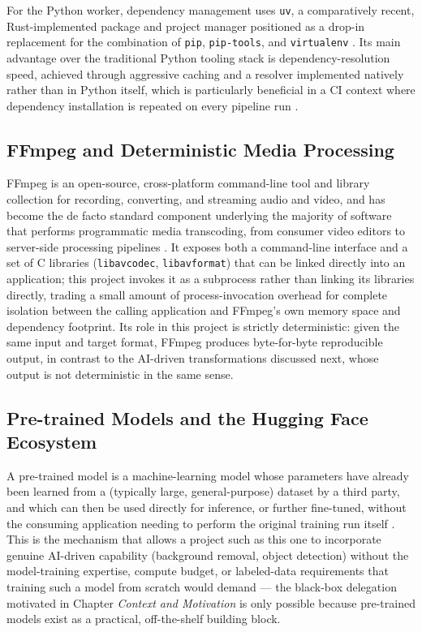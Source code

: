 \documentclass[twoside]{supsistudent}
\begin{document}
For the Python worker, dependency management uses \texttt{uv}, a comparatively recent, Rust-implemented package and project manager positioned as a drop-in replacement for the combination of \texttt{pip}, \texttt{pip-tools}, and \texttt{virtualenv} \cite{uv2026}. Its main advantage over the traditional Python tooling stack is dependency-resolution speed, achieved through aggressive caching and a resolver implemented natively rather than in Python itself, which is particularly beneficial in a CI context where dependency installation is repeated on every pipeline run \cite{uv2026-performance}.

\subsection{FFmpeg and Deterministic Media Processing}
FFmpeg is an open-source, cross-platform command-line tool and library collection for recording, converting, and streaming audio and video, and has become the de facto standard component underlying the majority of software that performs programmatic media transcoding, from consumer video editors to server-side processing pipelines \cite{chen2020cpu}. It exposes both a command-line interface and a set of C libraries (\texttt{libavcodec}, \texttt{libavformat}) that can be linked directly into an application; this project invokes it as a subprocess rather than linking its libraries directly, trading a small amount of process-invocation overhead for complete isolation between the calling application and FFmpeg's own memory space and dependency footprint. Its role in this project is strictly deterministic: given the same input and target format, FFmpeg produces byte-for-byte reproducible output, in contrast to the AI-driven transformations discussed next, whose output is not deterministic in the same sense.

\subsection{Pre-trained Models and the Hugging Face Ecosystem}
A pre-trained model is a machine-learning model whose parameters have already been learned from a (typically large, general-purpose) dataset by a third party, and which can then be used directly for inference, or further fine-tuned, without the consuming application needing to perform the original training run itself \cite{pan2010survey, dosovitskiy2021vit}. This is the mechanism that allows a project such as this one to incorporate genuine AI-driven capability (background removal, object detection) without the model-training expertise, compute budget, or labeled-data requirements that training such a model from scratch would demand — the black-box delegation motivated in Chapter \emph{Context and Motivation} is only possible because pre-trained models exist as a practical, off-the-shelf building block.
\end{document}
